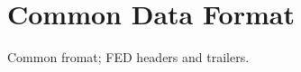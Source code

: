 \section{Common Data Format}\label{sec:CommonFormat}

Common fromat; FED headers and trailers.





